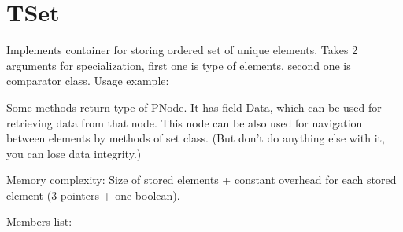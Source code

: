 \chapter{TSet}

Implements container for storing ordered set of unique elements.
Takes 2 arguments for specialization, first one is type of elements, second one is comparator class.
Usage example:



Some methods return type of PNode. It has field Data, which can be used for retrieving data from
that node. This node can be also used for navigation between elements by methods of set class.
(But don't do anything else with it, you can lose data integrity.)

Memory complexity:
Size of stored elements + constant overhead for each stored element (3 pointers + one boolean).

Members list:

